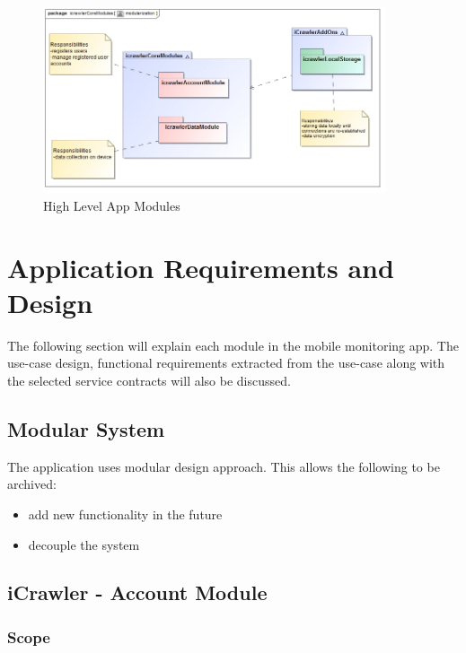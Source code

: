 \documentclass[hidelinks, 12pt, oneside]{article}
\begin{document}
			\begin{figure}[!htbp]
    			\centering
    			\includegraphics[width=0.9\textwidth]{img/highLevelSystem.jpg}
    			\caption{High Level App Modules}
    			\label{fig:highLevelSystem}
			\end{figure}


	\section{Application Requirements and Design}
	The following section will explain each module in the mobile monitoring app. The use-case design, functional requirements extracted from the use-case along with the selected service contracts will also be discussed.\newline
	
	\subsection{Modular System}
	 The application uses modular design approach. This allows the following to be archived:
	 \begin{itemize}
	\item add new functionality in the future
 	\item decouple the system
	\end{itemize}


	
	\subsection{iCrawler - Account Module}
	\subsubsection{Scope}
	
\end{document}
